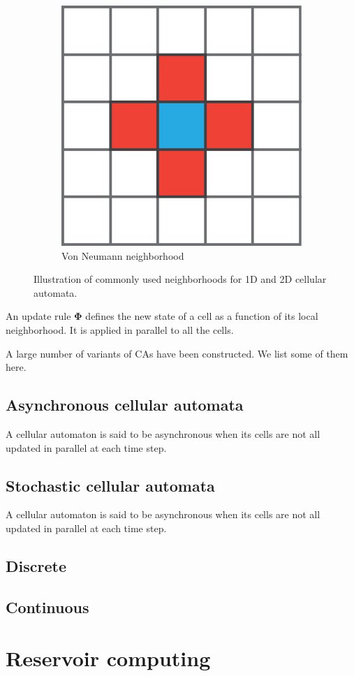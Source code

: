 \begin{figure}[htbp]
\begin{subfigure}[c]{.3\linewidth}
    \includegraphics[width=\linewidth]{figures/von_neumann}
    \caption{Von Neumann neighborhood}
    \label{fig:von_neumann}
  \end{subfigure}

  \caption{Illustration of commonly used neighborhoods for 1D and 2D cellular automata.}
  \label{fig:neighborhoods}
\end{figure}


An update rule $\boldsymbol{\Phi}$ defines the new state of a cell as a function of its local
neighborhood. It is applied in parallel to all the cells.

A large number of variants of \acp{CA} have been constructed. We list some of
them here.

\subsection{Asynchronous cellular automata}
A cellular automaton is said to be asynchronous when its cells are not all
updated in parallel at each time step.

\subsection{Stochastic cellular automata}
A cellular automaton is said to be asynchronous when its cells are not all
updated in parallel at each time step.

\subsection{Discrete}
\subsection{Continuous}

\section{Reservoir computing}
